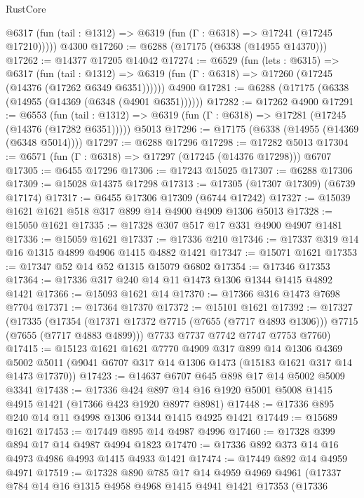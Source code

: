 \begin{lexlean}{RustCore}
\begin{coremodule}
      @6317 (fun (tail : @1312) => @6319 (fun (Γ : @6318) => @17241 (@17245 @17210)))))
    @4300
@17260 := @6288 (@17175 (@6338 (@14955 @14370)))
@17262 := @14377 @17205 @14042
@17274 := @6529
    (fun (lets : @6315) =>
    @6317
      (fun (tail : @1312) =>
      @6319 (fun (Γ : @6318) => @17260 (@17245 (@14376 (@17262 @6349 @6351))))))
    @4900
@17281 := @6288 (@17175 (@6338 (@14955 (@14369 (@6348 (@4901 @6351))))))
@17282 := @17262 @4900
@17291 := @6553
    (fun (tail : @1312) => @6319 (fun (Γ : @6318) => @17281 (@17245 (@14376 (@17282 @6351)))))
    @5013
@17296 := @17175 (@6338 (@14955 (@14369 (@6348 @5014))))
@17297 := @6288 @17296
@17298 := @17282 @5013
@17304 := @6571 (fun (Γ : @6318) => @17297 (@17245 (@14376 @17298))) @6707
@17305 := @6455 @17296
@17306 := @17243 @15025
@17307 := @6288 @17306
@17309 := @15028 @14375 @17298
@17313 := @17305 (@17307 @17309) (@6739 @17174)
@17317 := @6455 @17306 @17309 (@6744 @17242)
@17327 := @15039 @1621 @1621 @518 @317 @899 @14 @4900 @4909 @1306 @5013
@17328 := @15050 @1621
@17335 := @17328 @307 @517 @17 @331 @4900 @4907 @1481
@17336 := @15059 @1621
@17337 := @17336 @210
@17346 := @17337 @319 @14 @16 @1315 @4899 @4906 @1415 @4882 @1421
@17347 := @15071 @1621
@17353 := @17347 @52 @14 @52 @1315 @15079 @6802
@17354 := @17346 @17353
@17364 := @17336 @317 @240 @14 @11 @1473 @1306 @1344 @1415 @4892 @1421
@17366 := @15093 @1621 @14
@17370 := @17366 @316 @1473 @7698 @7704
@17371 := @17364 @17370
@17372 := @15101 @1621
@17392 := @17327
    (@17335
      (@17354 (@17371 @17372 @7715 (@7655 (@7717 @4893 @1306))) @7715 (@7655 (@7717 @4883 @4899)))
      @7733
      @7737
      @7742
      @7747
      @7753
      @7760)
@17415 := @15123
    @1621
    @1621
    @7770
    @4909
    @317
    @899
    @14
    @1306
    @4369
    @5002
    @5011
    (@9041 @6707 @317 @14 @1306 @1473 (@15183 @1621 @317 @14 @1473 @17370))
@17423 := @14637 @6707 @645 @898 @17 @14 @5002 @5009 @3341
@17438 := @17336
    @424
    @897
    @14
    @16
    @1920
    @5001
    @5008
    @1415
    @4915
    @1421
    (@17366 @423 @1920 @8977 @8981)
@17448 := @17336 @895 @240 @14 @11 @4998 @1306 @1344 @1415 @4925 @1421
@17449 := @15689 @1621
@17453 := @17449 @895 @14 @4987 @4996
@17460 := @17328 @399 @894 @17 @14 @4987 @4994 @1823
@17470 := @17336 @892 @373 @14 @16 @4973 @4986 @4993 @1415 @4933 @1421
@17474 := @17449 @892 @14 @4959 @4971
@17519 := @17328
    @890
    @785
    @17
    @14
    @4959
    @4969
    @4961
    (@17337
      @784
      @14
      @16
      @1315
      @4958
      @4968
      @1415
      @4941
      @1421
      @17353
      (@17336

\end{coremodule}
\end{lexlean}
